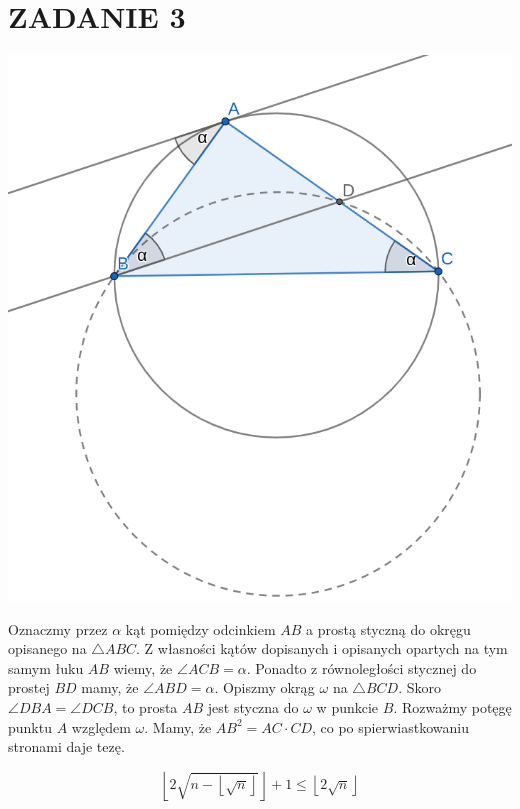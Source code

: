 \documentclass{article}
\begin{document}
\section*{ZADANIE 3}
\begin{minipage}{0.6\linewidth}
    \includegraphics[width=\linewidth]{zadanie3pw.png}
\end{minipage}
\begin{minipage}{0.4\linewidth}
    Oznaczmy przez \(\alpha\) kąt pomiędzy odcinkiem \(AB\) a prostą styczną do okręgu opisanego na \( \triangle ABC \). Z własności kątów dopisanych i opisanych opartych na tym samym łuku \(AB\) wiemy, że \(\angle ACB = \alpha \). Ponadto z równoległości stycznej do prostej \(BD\) mamy, że \(\angle ABD = \alpha \). Opiszmy okrąg \(\omega\) na \(\triangle BCD\). Skoro \(\angle DBA = \angle DCB\), to prosta \(AB\) jest styczna do \(\omega\)  w punkcie \(B\). Rozważmy potęgę punktu \(A\) względem \(\omega\). Mamy, że \(AB^2 = AC \cdot CD\), co po spierwiastkowaniu stronami daje tezę. 
\end{minipage}

\[
    \left\lfloor 2\sqrt{n-\left\lfloor \sqrt{n}  \right\rfloor}  \right\rfloor + 1 \leq \left\lfloor 2\sqrt{n}  \right\rfloor
\]
\end{document}
